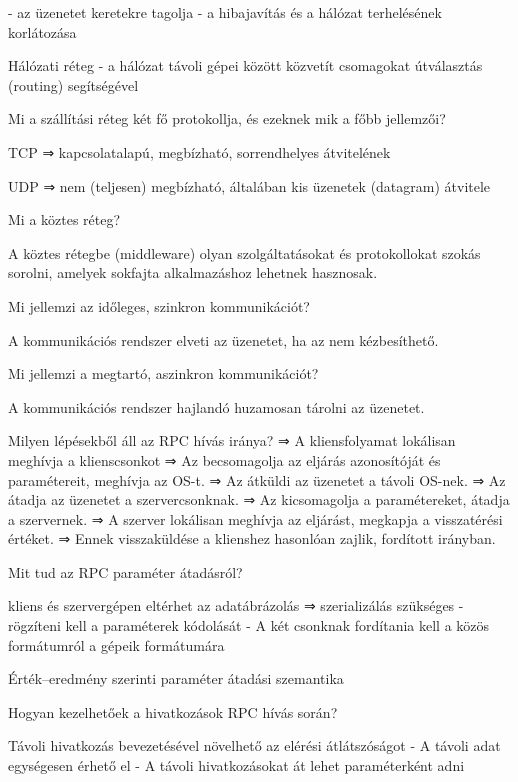 \documentclass[12pt]{article}
\begin{document}
\begin{description}
        - az üzenetet keretekre tagolja
        - a hibajavítás és a hálózat terhelésének korlátozása
    \item Hálózati réteg
        - a hálózat távoli gépei között közvetít csomagokat útválasztás (routing) segítségével
    \item  Mi a szállítási réteg két fő protokollja, és ezeknek mik a főbb jellemzői?
    \item TCP ⇒ kapcsolatalapú, megbízható, sorrendhelyes átvitelének
    \item UDP ⇒ nem (teljesen) megbízható, általában kis üzenetek (datagram) átvitele	
    \item  Mi a köztes réteg?
    \item A köztes rétegbe (middleware) olyan szolgáltatásokat és protokollokat szokás sorolni, amelyek sokfajta alkalmazáshoz lehetnek hasznosak.
    \item  Mi jellemzi az időleges, szinkron kommunikációt?
    \item A kommunikációs rendszer elveti az üzenetet, ha az nem kézbesíthető.
    \item  Mi jellemzi a megtartó, aszinkron kommunikációt?
    \item A kommunikációs rendszer hajlandó huzamosan tárolni az üzenetet.
    \item  Milyen lépésekből áll az RPC hívás iránya?
        ⇒ A kliensfolyamat lokálisan meghívja a klienscsonkot
        ⇒ Az becsomagolja az eljárás azonosítóját és paramétereit, meghívja az OS-t.
        ⇒ Az átküldi az üzenetet a távoli OS-nek.
        ⇒ Az átadja az üzenetet a szervercsonknak.
        ⇒ Az kicsomagolja a paramétereket, átadja a szervernek.
        ⇒ A szerver lokálisan meghívja az eljárást, megkapja a visszatérési értéket.
        ⇒ Ennek visszaküldése a klienshez hasonlóan zajlik, fordított irányban.
    \item  Mit tud az RPC paraméter átadásról?
    \item kliens és szervergépen eltérhet az adatábrázolás ⇒ szerializálás szükséges
        - rögzíteni kell a paraméterek kódolását
        - A két csonknak fordítania kell a közös formátumról a gépeik formátumára
    \item Érték–eredmény szerinti paraméter átadási szemantika
    \item  Hogyan kezelhetőek a hivatkozások RPC hívás során?
    \item Távoli hivatkozás bevezetésével növelhető az elérési átlátszóságot
        - A távoli adat egységesen érhető el
        - A távoli hivatkozásokat át lehet paraméterként adni

\end{description}
\end{document}
